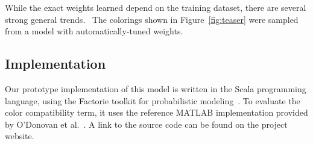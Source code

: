 While the exact weights learned depend on the training dataset, there are several strong general trends.~ The colorings shown in Figure~\ref{fig:teaser} were sampled from a model with automatically-tuned weights.

\subsection{Implementation}
\label{sec:implementation}

Our prototype implementation of this model is written in the Scala programming language, using the Factorie toolkit for probabilistic modeling~\cite{Factorie}. To evaluate the color compatibility term, it uses the reference MATLAB implementation provided by O'Donovan et al.~. A link to the source code can be found on the project website.